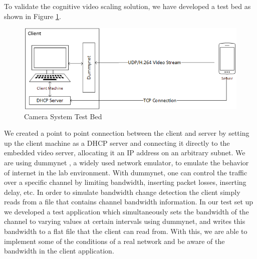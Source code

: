 To validate the cognitive video scaling solution, we have developed a test bed as shown in Figure \ref{fig:Testbed}.
\begin{figure}[H]
\centering
\includegraphics[width=0.7\linewidth]{images/CameraSystemTestbed.png}
\caption{Camera System Test Bed}
\label{fig:Testbed}
\end{figure}
We created a point to point connection between the client and server by setting up the client machine as a DHCP server and connecting it directly to the embedded video server, allocating it an IP address on an arbitrary subnet. We are using dummynet , a widely used network emulator, to emulate the behavior of internet in the lab environment. With dummynet, one can control the traffic over a specific channel by limiting bandwidth, inserting packet losses, inserting delay, etc. In order to simulate bandwidth change detection the client simply reads from a file that contains channel bandwidth information. In our test set up we developed a test application which simultaneously sets the bandwidth of the channel to varying values at certain intervals using dummynet, and writes this bandwidth to a flat file that the client can read from. With this, we are able to implement some of the conditions of a real network and be aware of the bandwidth in the client application. 

